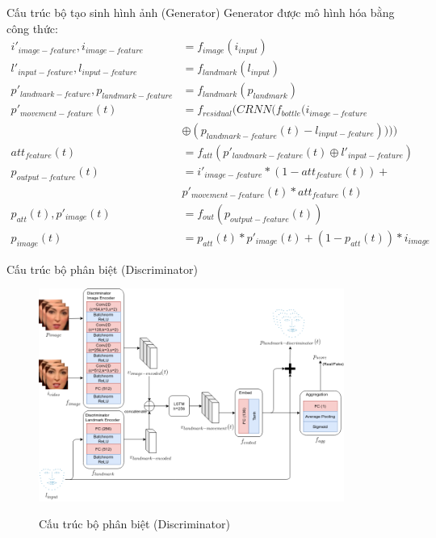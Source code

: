 \begin{frame}{Cấu trúc bộ tạo sinh hình ảnh (Generator)}
    Generator được mô hình hóa bằng công thức:
    \begin{equation}
        \begin{split}
        i'_{image-feature}, i_{image-feature} &= f_{image}(i_{input})\\
        l'_{input-feature}, l_{input-feature} &= f_{landmark}(l_{input})\\
        p'_{landmark-feature}, p_{landmark-feature} &= f_{landmark}(p_{landmark})\\
        p'_{movement-feature}(t) &= f_{residual}(CRNN(f_{bottle}(i_{image-feature} \\
        &\oplus (p_{landmark-feature}(t)-l_{input-feature}))))\\
        att_{feature}(t) &= f_{att}(p'_{landmark-feature}(t) \oplus l'_{input-feature})\\
        p_{output-feature}(t) &= i'_{image-feature}*(1-att_{feature}(t))+\\
        &p'_{movement-feature}(t)*att_{feature}(t)\\
        p_{att}(t), p'_{image}(t) &= f_{out}(p_{output-feature}(t))\\
        p_{image}(t) &= p_{att}(t)*p'_{image}(t)+(1-p_{att}(t))*i_{image}
        \end{split}
    \end{equation}
\end{frame}

\begin{frame}{Cấu trúc bộ phân biệt (Discriminator)}
    \begin{figure}[H]
        \centering
        \includegraphics[width=10cm]{images/discriminator.png}
        \label{fig:discriminator}
        \caption{Cấu trúc bộ phân biệt (Discriminator)}
    \end{figure}
\end{frame}

